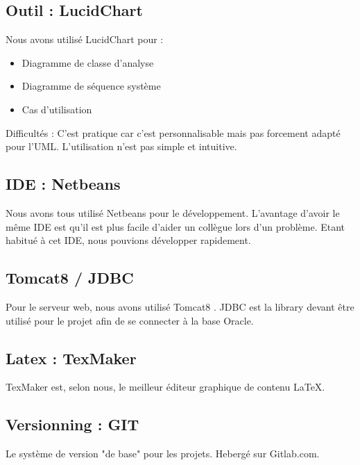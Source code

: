 \documentclass[a4paper,oneside,10pt]{article}
\begin{document}
\subsection{Outil : LucidChart}

Nous avons utilisé LucidChart pour : 
\begin{itemize}
	\item Diagramme de classe d'analyse
	\item Diagramme de séquence système
	\item Cas d'utilisation
\end{itemize}

Difficultés : C'est pratique car c'est personnalisable mais pas forcement adapté pour l'UML. L'utilisation n'est pas simple et intuitive. 

\subsection{IDE : Netbeans}

Nous avons tous utilisé Netbeans pour le développement. L'avantage d'avoir le même IDE est qu'il est plus facile d'aider un collègue lors d'un problème. Etant habitué à cet IDE, nous pouvions développer rapidement. 

\subsection{Tomcat8 / JDBC}

Pour le serveur web, nous avons utilisé Tomcat8 . 
JDBC est la library devant être utilisé pour le projet afin de se connecter à la base Oracle.  

\subsection{Latex : TexMaker}

TexMaker est, selon nous, le meilleur éditeur graphique de contenu \LaTeX. 

\subsection{Versionning : GIT}

Le système de version "de base" pour les projets. Hebergé sur Gitlab.com. 
\end{document}
